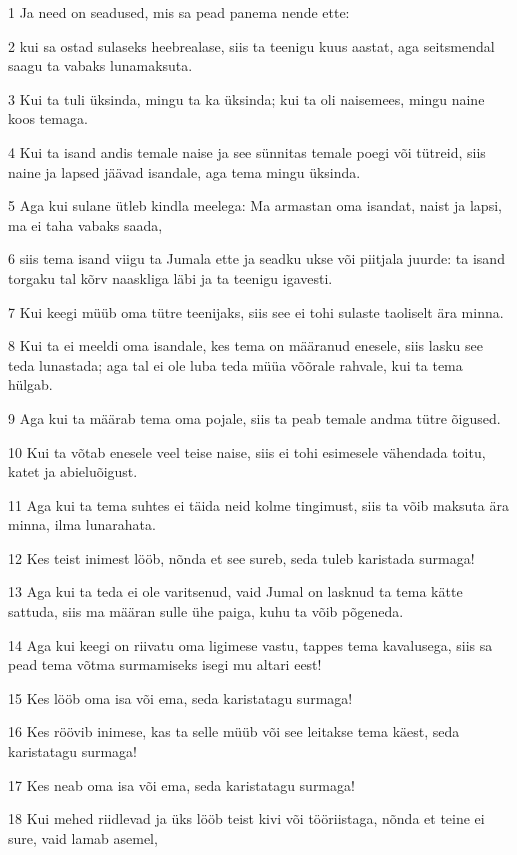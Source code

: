 \par 1 Ja need on seadused, mis sa pead panema nende ette:
\par 2 kui sa ostad sulaseks heebrealase, siis ta teenigu kuus aastat, aga seitsmendal saagu ta vabaks lunamaksuta.
\par 3 Kui ta tuli üksinda, mingu ta ka üksinda; kui ta oli naisemees, mingu naine koos temaga.
\par 4 Kui ta isand andis temale naise ja see sünnitas temale poegi või tütreid, siis naine ja lapsed jäävad isandale, aga tema mingu üksinda.
\par 5 Aga kui sulane ütleb kindla meelega: Ma armastan oma isandat, naist ja lapsi, ma ei taha vabaks saada,
\par 6 siis tema isand viigu ta Jumala ette ja seadku ukse või piitjala juurde: ta isand torgaku tal kõrv naaskliga läbi ja ta teenigu igavesti.
\par 7 Kui keegi müüb oma tütre teenijaks, siis see ei tohi sulaste taoliselt ära minna.
\par 8 Kui ta ei meeldi oma isandale, kes tema on määranud enesele, siis lasku see teda lunastada; aga tal ei ole luba teda müüa võõrale rahvale, kui ta tema hülgab.
\par 9 Aga kui ta määrab tema oma pojale, siis ta peab temale andma tütre õigused.
\par 10 Kui ta võtab enesele veel teise naise, siis ei tohi esimesele vähendada toitu, katet ja abieluõigust.
\par 11 Aga kui ta tema suhtes ei täida neid kolme tingimust, siis ta võib maksuta ära minna, ilma lunarahata.
\par 12 Kes teist inimest lööb, nõnda et see sureb, seda tuleb karistada surmaga!
\par 13 Aga kui ta teda ei ole varitsenud, vaid Jumal on lasknud ta tema kätte sattuda, siis ma määran sulle ühe paiga, kuhu ta võib põgeneda.
\par 14 Aga kui keegi on riivatu oma ligimese vastu, tappes tema kavalusega, siis sa pead tema võtma surmamiseks isegi mu altari eest!
\par 15 Kes lööb oma isa või ema, seda karistatagu surmaga!
\par 16 Kes röövib inimese, kas ta selle müüb või see leitakse tema käest, seda karistatagu surmaga!
\par 17 Kes neab oma isa või ema, seda karistatagu surmaga!
\par 18 Kui mehed riidlevad ja üks lööb teist kivi või tööriistaga, nõnda et teine ei sure, vaid lamab asemel,
